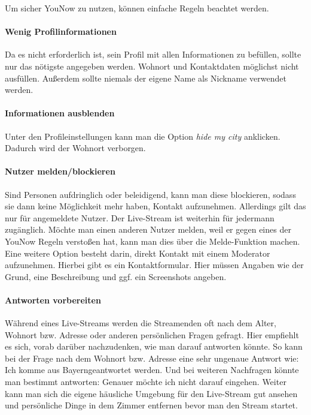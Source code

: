 Um sicher YouNow zu nutzen, können einfache Regeln beachtet werden. 

\paragraph{Wenig Profilinformationen}
Da es nicht erforderlich ist, sein Profil mit allen Informationen zu befüllen, sollte nur das nötigste angegeben werden. Wohnort und Kontaktdaten möglichst nicht ausfüllen. Außerdem sollte niemals der eigene Name als Nickname verwendet werden.

\paragraph{Informationen ausblenden}
Unter den Profileinstellungen kann man die Option \textit{hide my city} anklicken. Dadurch wird der Wohnort verborgen.

\paragraph{Nutzer melden/blockieren}
Sind Personen aufdringlich oder beleidigend, kann man diese blockieren, sodass sie dann keine Möglichkeit mehr haben, Kontakt aufzunehmen. Allerdings gilt das nur für angemeldete Nutzer. Der Live-Stream ist weiterhin für jedermann zugänglich.
Möchte man einen anderen Nutzer melden, weil er gegen eines der YouNow Regeln verstoßen hat, kann man dies über die Melde-Funktion machen. Eine weitere Option besteht darin, direkt Kontakt mit einem Moderator aufzunehmen. Hierbei gibt es ein Kontaktformular. Hier müssen Angaben wie der Grund, eine Beschreibung und ggf. ein Screenshots angeben.

\paragraph{Antworten vorbereiten}
Während eines Live-Streams werden die Streamenden oft nach dem Alter, Wohnort bzw. Adresse oder anderen persönlichen Fragen gefragt. Hier empfiehlt es sich, vorab darüber nachzudenken, wie man darauf antworten könnte. So kann bei der Frage nach dem Wohnort bzw. Adresse eine sehr ungenaue Antwort wie: \glqq Ich komme aus Bayern\grqq geantwortet werden. Und bei weiteren Nachfragen könnte man bestimmt antworten: \glqq Genauer möchte ich nicht darauf eingehen\grqq .
Weiter kann man sich die eigene häusliche Umgebung für den Live-Stream gut ansehen und persönliche Dinge in dem Zimmer entfernen bevor man den Stream startet. 
